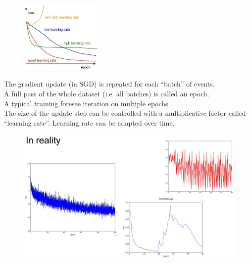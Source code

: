 \begin{figure}
	\includegraphics[width=0.35\textwidth]{figure_ml/learning_rate.png}
\end{figure} 

The gradient update (in SGD) is repeated for each “batch” of events.\\

A full pass of the whole dataset (i.e. all batches) is called an epoch.\\

A typical training foresee iteration on multiple epochs.\\

The size of the update step can be controlled with a multiplicative factor called “learning rate”. Learning rate can be adapted over time.



\begin{figure}[ht]
	\centering
	\includegraphics[width=0.6\linewidth]{figure_ml/real_lr.png}
\end{figure}
\FloatBarrier

